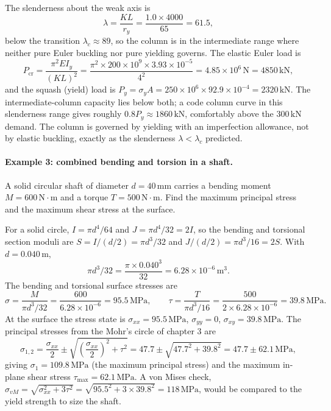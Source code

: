The slenderness about the weak axis is
\[
\lambda = \frac{KL}{r_y} = \frac{1.0 \times 4000}{65} = 61.5,
\]
below the transition $\lambda_c \approx 89$, so the column is in the
intermediate range where neither pure Euler buckling nor pure yielding
governs. The elastic Euler load is
\[
P_{\text{cr}} = \frac{\pi^2 E I_y}{(KL)^2}
= \frac{\pi^2 \times 200 \times 10^9 \times 3.93 \times 10^{-5}}
{4^2}
= 4.85 \times 10^6\,\text{N} = 4850\,\text{kN},
\]
and the squash (yield) load is $P_y = \sigma_y A = 250\times 10^6
\times 92.9 \times 10^{-4} = 2320\,\text{kN}$. The intermediate-column
capacity lies below both; a code column curve in this slenderness
range gives roughly $0.8 P_y \approx 1860\,\text{kN}$, comfortably
above the $300\,\text{kN}$ demand. The column is governed by yielding
with an imperfection allowance, not by elastic buckling, exactly as the
slenderness $\lambda < \lambda_c$ predicted.

\paragraph{Example 3: combined bending and torsion in a shaft.}
A solid circular shaft of diameter $d = 40\,\si{\milli\meter}$ carries
a bending moment $M = 600\,\text{N}\cdot\text{m}$ and a torque $T =
500\,\text{N}\cdot\text{m}$. Find the maximum principal stress and the
maximum shear stress at the surface.

For a solid circle, $I = \pi d^4/64$ and $J = \pi d^4/32 = 2I$, so the
bending and torsional section moduli are $S = I/(d/2) = \pi d^3/32$ and
$J/(d/2) = \pi d^3/16 = 2S$. With $d = 0.040\,\si{\meter}$,
\[
\pi d^3/32 = \frac{\pi \times 0.040^3}{32} = 6.28 \times 10^{-6}
\,\si{\meter\cubed}.
\]
The bending and torsional surface stresses are
\[
\sigma = \frac{M}{\pi d^3/32} = \frac{600}{6.28\times 10^{-6}}
= 95.5\,\text{MPa}, \qquad
\tau = \frac{T}{\pi d^3/16} = \frac{500}{2 \times 6.28\times 10^{-6}}
= 39.8\,\text{MPa}.
\]
At the surface the stress state is $\sigma_{xx} = 95.5\,\text{MPa}$,
$\sigma_{yy} = 0$, $\sigma_{xy} = 39.8\,\text{MPa}$. The principal
stresses from the Mohr's circle of chapter 3 are
\[
\sigma_{1,2} = \frac{\sigma_{xx}}{2} \pm \sqrt{\left(\frac{\sigma_{xx}}
{2}\right)^2 + \tau^2}
= 47.7 \pm \sqrt{47.7^2 + 39.8^2}
= 47.7 \pm 62.1\,\text{MPa},
\]
giving $\sigma_1 = 109.8\,\text{MPa}$ (the maximum principal stress)
and the maximum in-plane shear stress $\tau_{\max} = 62.1\,\text{MPa}$.
A von Mises check, $\sigma_{vM} = \sqrt{\sigma_{xx}^2 + 3\tau^2} =
\sqrt{95.5^2 + 3\times 39.8^2} = 118\,\text{MPa}$, would be compared to
the yield strength to size the shaft.

